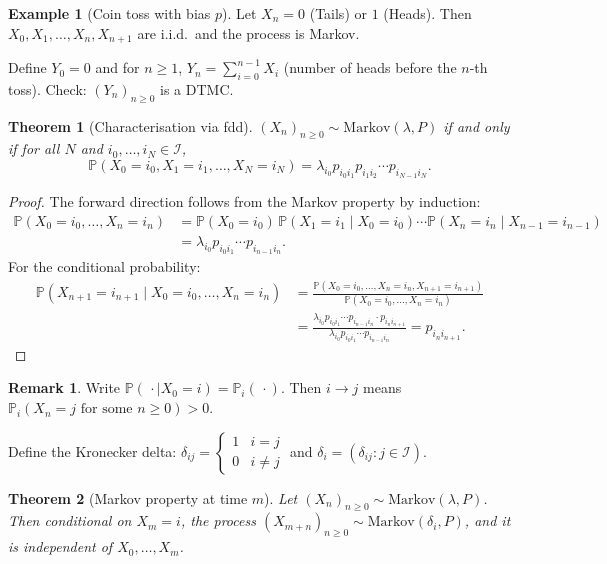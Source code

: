 \documentclass[12pt, a4paper]{article}
\theoremstyle{definition}
\newtheorem{example}{Example}[section]
\newtheorem{remark}{Remark}[section]
\theoremstyle{plain}
\newtheorem{theorem}{Theorem}[section]
\newcommand{\PP}{\mathbb{P}}
\newcommand{\II}{\mathcal{I}}
\begin{document}
\begin{example}[Coin toss with bias $p$]
Let $X_n = 0$ (Tails) or $1$ (Heads). Then $X_0, X_1, \ldots, X_n, X_{n+1}$ are i.i.d.\ and the process is Markov.

Define $Y_0 = 0$ and for $n \ge 1$, $Y_n = \sum_{i=0}^{n-1} X_i$ (number of heads before the $n$-th toss). Check: $(Y_n)_{n \ge 0}$ is a DTMC.
\end{example}

\begin{theorem}[Characterisation via fdd]
$(X_n)_{n \ge 0} \sim \text{Markov}(\lambda, P)$ if and only if for all $N$ and $i_0, \ldots, i_N \in \II$,
\begin{equation*}
  \PP(X_0 = i_0, X_1 = i_1, \ldots, X_N = i_N) = \lambda_{i_0} p_{i_0 i_1} p_{i_1 i_2} \cdots p_{i_{N-1} i_N}.
\end{equation*}
\end{theorem}

\begin{proof}
The forward direction follows from the Markov property by induction:
\begin{align*}
  \PP(X_0 = i_0, \ldots, X_n = i_n) &= \PP(X_0 = i_0)\,\PP(X_1 = i_1 \mid X_0 = i_0)\cdots\PP(X_n = i_n \mid X_{n-1} = i_{n-1}) \\
  &= \lambda_{i_0} p_{i_0 i_1} \cdots p_{i_{n-1} i_n}.
\end{align*}
For the conditional probability:
\begin{align*}
  \PP(X_{n+1} = i_{n+1} \mid X_0 = i_0, \ldots, X_n = i_n)
  &= \frac{\PP(X_0 = i_0, \ldots, X_n = i_n, X_{n+1} = i_{n+1})}{\PP(X_0 = i_0, \ldots, X_n = i_n)} \\
  &= \frac{\lambda_{i_0} p_{i_0 i_1} \cdots p_{i_{n-1} i_n} \cdot p_{i_n i_{n+1}}}{\lambda_{i_0} p_{i_0 i_1} \cdots p_{i_{n-1} i_n}} = p_{i_n i_{n+1}}.
\end{align*}
\end{proof}

\begin{remark}
Write $\PP(\,\cdot \mid X_0 = i) = \PP_i(\,\cdot)$. Then $i \to j$ means $\PP_i(X_n = j \text{ for some } n \ge 0) > 0$.
\end{remark}

Define the Kronecker delta: $\delta_{ij} = \begin{cases}1 & i = j \\ 0 & i \neq j\end{cases}$ and $\delta_i = (\delta_{ij} : j \in \II)$.

\begin{theorem}[Markov property at time $m$]
Let $(X_n)_{n \ge 0} \sim \text{Markov}(\lambda, P)$. Then conditional on $X_m = i$, the process $(X_{m+n})_{n \ge 0} \sim \text{Markov}(\delta_i, P)$, and it is independent of $X_0, \ldots, X_m$.
\end{theorem}
\end{document}
